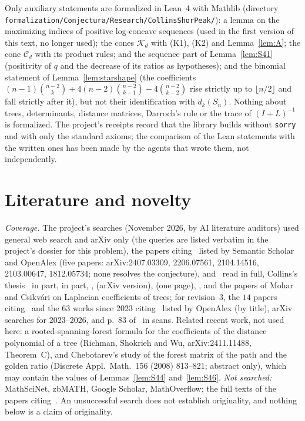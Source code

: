 \documentclass[11pt]{amsart}
\theoremstyle{definition}
\theoremstyle{remark}
\newcommand{\K}{\mathcal K}
\begin{document}
Only auxiliary statements are formalized in Lean~4 with Mathlib (directory
\nolinkurl{formalization/Conjectura/Research/CollinsShorPeak/}): a lemma on
the maximizing indices of positive log-concave sequences (used in the first
version of this text, no longer used); the cones $\K_d$ with (K1), (K2) and
Lemma~\ref{lem:A}; the cone $\mathcal C_d$ with its product rules; and the
sequence part of Lemma~\ref{lem:S41} (positivity of $q$ and the decrease of
its ratios as hypotheses); and the binomial statement of
Lemma~\ref{lem:starshape} (the coefficients $(n-1)\binom{n-2}k+4(n-2)\binom{n-2}{k-1}-4\binom{n-2}{k-2}$
rise strictly up to $\lfloor n/2\rfloor$ and fall strictly after it), but not
their identification with $d_k(S_n)$. Nothing about trees, determinants, distance
matrices, Darroch's rule or the trace of $(I+L)^{-1}$ is formalized. The
project's receipts record that the library builds without \texttt{sorry} and
with only the standard axioms; the comparison of the Lean statements with the
written ones has been made by the agents that wrote them, not independently.

\section{Literature and novelty}\label{sec:literature}

\emph{Coverage.} The project's searches (November 2026, by AI literature
auditors) used general web search and arXiv only (the queries are listed verbatim in
the project's dossier for this problem), the papers citing~\cite{AAB} listed by Semantic Scholar and
OpenAlex (five papers: arXiv:2407.03309, 2206.07561, 2104.14516, 2103.00647,
1812.05734; none resolves the conjecture), \cite{AAB} and~\cite{Col89} read in full, Collins's
thesis~\cite{Col86} in part, \cite{GL78} in part, \cite{Mer90}, \cite{AMW}
(arXiv version), \cite{Pit97} (one page), \cite{CS06}, and the papers of
Mohar and Csikv\'ari on Laplacian coefficients of trees; for revision~3, the
$14$ papers citing~\cite{AMW} and the $63$ works since 2023 citing~\cite{GL78}
listed by OpenAlex (by title), arXiv searches for 2023--2026, \cite{GP71} and
p.~83 of~\cite{GL78} in scans. Related recent work, not used here: a
rooted-spanning-forest formula for the coefficients of the distance
polynomial of a tree (Richman, Shokrieh and Wu, arXiv:2411.11488,
Theorem~C), and Chebotarev's study of the forest matrix of the path and the
golden ratio (Discrete Appl.\ Math.\ 156 (2008) 813--821; abstract only),
which may contain the values of Lemmas~\ref{lem:S44} and~\ref{lem:S46}.
\emph{Not searched:} MathSciNet, zbMATH, Google Scholar, MathOverflow; the
full texts of the papers citing~\cite{AMW}.
An unsuccessful search does not establish originality, and nothing below is
a claim of originality.
\end{document}
